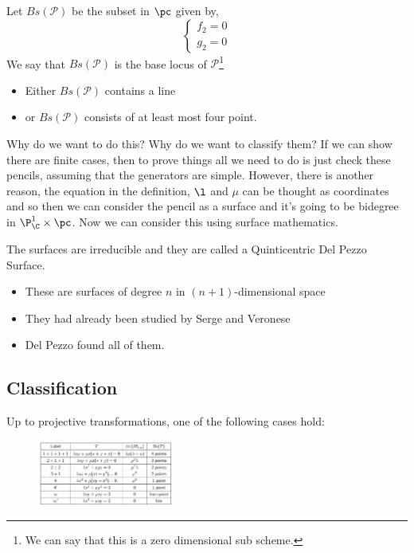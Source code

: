 \documentclass{article}
\begin{document}
\begin{ndefi}
  Let $Bs(\mathcal{P})$ be the subset in $\pc$ given by,
  $$ \begin{cases}
    f_2= 0\\
    g_2 = 0
  \end{cases} $$
  We say that $Bs(\mathcal{P})$ is the base locus of $\mathcal{P}$\footnote{We can say that this is a zero dimensional sub scheme.}
\end{ndefi}

\begin{itemize}
  \item Either $Bs(\mathcal{P})$ contains a line
  \item or $Bs(\mathcal{P})$ consists of at least most four point.
\end{itemize}

Why do we want to do this? Why do we want to classify them? If we can show there are finite cases, then to prove things all we need to do is just check these pencils, assuming that the generators are simple. However, there is another reason, the equation in the definition, $\l$ and $\mu$ can be thought as coordinates and so then we can consider the pencil as a surface and it's going to be bidegree in $\P_\C^1 \times \pc$. Now we can consider this using surface mathematics.

The surfaces are irreducible and they are called a Quinticentric Del Pezzo Surface.
\begin{itemize}
  \item These are surfaces of degree $n$ in $(n+1)$-dimensional space
  \item They had already been studied by Serge and Veronese
  \item Del Pezzo found all of them.
\end{itemize}

\newpage
\subsection{Classification}
Up to projective transformations, one of the following cases hold:

\begin{figure}[!ht]
\centering
\includegraphics[width=0.4\textwidth]{./figures/L4.1}
\end{figure}
\end{document}
